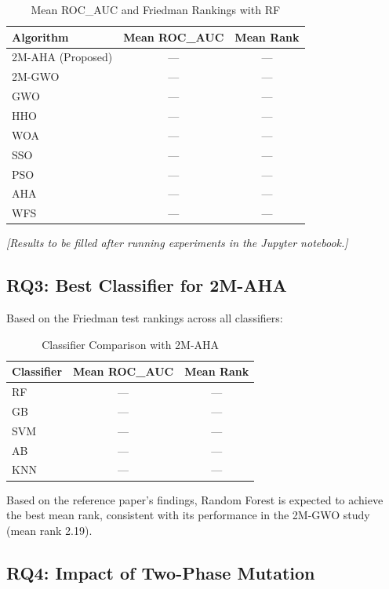 \documentclass[conference,twocolumn]{IEEEtran}
\begin{document}
\begin{table}[h]
\centering
\caption{Mean ROC\_AUC and Friedman Rankings with RF}
\label{tab:comparison}
\begin{tabular}{lcc}
\toprule
\textbf{Algorithm} & \textbf{Mean ROC\_AUC} & \textbf{Mean Rank} \\
\midrule
2M-AHA (Proposed) & --- & --- \\
2M-GWO & --- & --- \\
GWO & --- & --- \\
HHO & --- & --- \\
WOA & --- & --- \\
SSO & --- & --- \\
PSO & --- & --- \\
AHA & --- & --- \\
WFS & --- & --- \\
\bottomrule
\end{tabular}
\end{table}

\textit{[Results to be filled after running experiments in the Jupyter notebook.]}

\subsection{RQ3: Best Classifier for 2M-AHA}

Based on the Friedman test rankings across all classifiers:

\begin{table}[h]
\centering
\caption{Classifier Comparison with 2M-AHA}
\label{tab:classifiers}
\begin{tabular}{lcc}
\toprule
\textbf{Classifier} & \textbf{Mean ROC\_AUC} & \textbf{Mean Rank} \\
\midrule
RF & --- & --- \\
GB & --- & --- \\
SVM & --- & --- \\
AB & --- & --- \\
KNN & --- & --- \\
\bottomrule
\end{tabular}
\end{table}

Based on the reference paper's findings, Random Forest is expected to achieve the best mean rank, consistent with its performance in the 2M-GWO study (mean rank 2.19).

\subsection{RQ4: Impact of Two-Phase Mutation}
\end{document}
